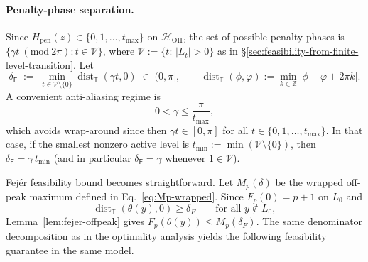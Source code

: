 \documentclass[a4paper,unpublished,onecolumn,11pt]{quantumarticle}
\theoremstyle{definition}
\theoremstyle{remark}
\newcommand{\OH}{\mathcal{H}_{\mathrm{OH}}}
\newcommand{\dist}{\operatorname{dist}}
\begin{document}
\begin{appendix}
\paragraph{Penalty-phase separation.}
Since $H_{\mathrm{pen}}(z)\in\{0,1,\dots,t_{\max}\}$ on $\OH$, the set of possible
penalty phases is $\{\gamma t\ (\mathrm{mod}\ 2\pi): t\in\mathcal V\}$, where
$\mathcal V:=\{t:\,|L_t|>0\}$ as in \S\ref{sec:feasibility-from-finite-level-transition}.
Let
\begin{equation}
\label{eq:delta-feasible}
\delta_{\mathsf F}
\;:=\;
\min_{t\in\mathcal V\setminus\{0\}}
\dist_{\mathbb T}(\gamma t,0)
\;\in\;(0,\pi],
\qquad
\dist_{\mathbb T}(\phi,\varphi):=\min_{k\in\mathbb Z}|\phi-\varphi+2\pi k|.
\end{equation}
A convenient anti-aliasing regime is
\begin{equation}
\label{eq:gamma-safe-pen}
0<\gamma\le \frac{\pi}{t_{\max}},
\end{equation}
which avoids wrap-around since then $\gamma t\in[0,\pi]$ for all $t\in\{0,1,\dots,t_{\max}\}$.
In that case, if the smallest nonzero active level is $t_{\min}:=\min(\mathcal V\setminus\{0\})$,
then $\delta_{\mathsf F}=\gamma\,t_{\min}$ (and in particular $\delta_{\mathsf F}=\gamma$ whenever
$1\in\mathcal V$). 


Fej\'er feasibility bound becomes straightforward. Let $M_p(\delta)$ be the wrapped off-peak maximum defined in
Eq.~\eqref{eq:Mp-wrapped}. Since $F_p(0)=p+1$ on $L_0$ and
\[
\operatorname{dist}_{\mathbb T}(\theta(y),0)\ge\delta_F
\qquad
\text{for all }y\notin L_0,
\]
Lemma~\ref{lem:fejer-offpeak} gives
$F_p(\theta(y))\le M_p(\delta_F)$. The same denominator decomposition as in the optimality analysis yields the following feasibility guarantee in the same model.


\end{appendix}
\end{document}
